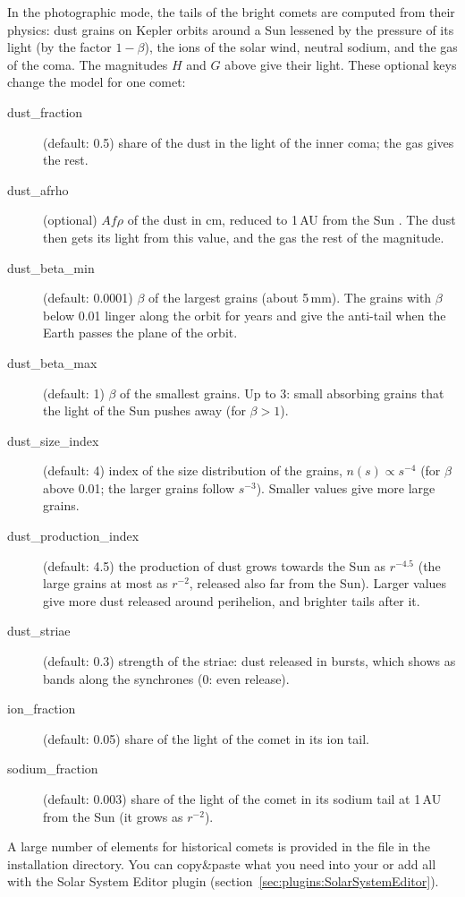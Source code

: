 In the photographic mode, the tails of the bright comets are computed from their physics: dust grains on Kepler
orbits around a Sun lessened by the pressure of its light (by the factor $1-\beta$), the ions of the solar wind,
neutral sodium, and the gas of the coma. The magnitudes $H$ and $G$ above give their light. These optional keys
change the model for one comet:
\begin{description}
\item[dust\_fraction] (default: 0.5) share of the dust in the light of the inner coma; the gas gives the rest.
\item[dust\_afrho] (optional) $Af\rho$ of the dust in cm, reduced to 1\,AU from the Sun \citep{AHearn:1984}.
	The dust then gets its light from this value, and the gas the rest of the magnitude.
\item[dust\_beta\_min] (default: 0.0001) $\beta$ of the largest grains (about 5\,mm). The grains with $\beta$
	below 0.01 linger along the orbit for years and give the anti-tail when the Earth passes the plane of the orbit.
\item[dust\_beta\_max] (default: 1) $\beta$ of the smallest grains. Up to 3: small absorbing grains
	that the light of the Sun pushes away (for $\beta>1$).
\item[dust\_size\_index] (default: 4) index of the size distribution of the grains, $n(s)\propto s^{-4}$
	(for $\beta$ above 0.01; the larger grains follow $s^{-3}$). Smaller values give more large grains.
\item[dust\_production\_index] (default: 4.5) the production of dust grows towards the Sun as $r^{-4.5}$
	(the large grains at most as $r^{-2}$, released also far from the Sun).
	Larger values give more dust released around perihelion, and brighter tails after it.
\item[dust\_striae] (default: 0.3) strength of the striae: dust released in bursts, which shows as bands along the
	synchrones (0: even release).
\item[ion\_fraction] (default: 0.05) share of the light of the comet in its ion tail.
\item[sodium\_fraction] (default: 0.003) share of the light of the comet in its sodium tail at 1\,AU from the Sun
	(it grows as $r^{-2}$).
\end{description}

A large number of elements for historical comets is provided in the
file  in the installation directory. You
can copy\&paste what you need into your
 or add all with the Solar System Editor plugin (section~\ref{sec:plugins:SolarSystemEditor}). 


